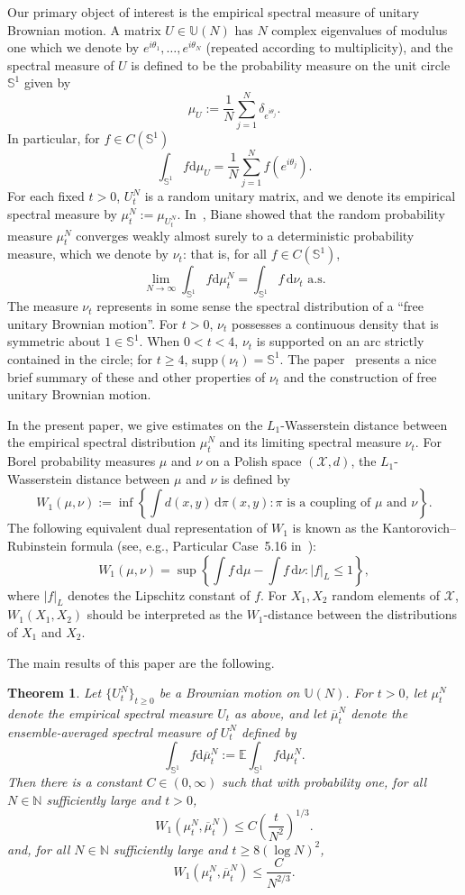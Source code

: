 \documentclass[11pt]{article}
\newtheorem{thm}[theo]{Theorem}
\theoremstyle{definition}
\numberwithin{equation}{section}
\numberwithin{figure}{section}
\numberwithin{table}{section}
\newcommand{\Circle}{\mathbb{S}^1}
\newcommand{\E}{\mathbb{E}}
\newcommand*{\dd}{\mathrm{d}}
\newcommand*{\dmu}{\dd \mu}
\newcommand*{\dbmu}{\dd \overline{\mu}}
\begin{document}
Our primary object of interest is the empirical spectral measure of unitary Brownian motion. A matrix $U\in\mathbb{U}(N)$ has $N$ complex eigenvalues of modulus one which we denote by $e^{i\theta_1},\ldots,e^{i\theta_N}$ (repeated according to multiplicity), and the spectral measure of $U$ is defined to be the probability measure on the unit circle $\mathbb{S}^1$ given by
\[
\mu_U:=\frac{1}{N}\sum_{j=1}^N \delta_{e^{i\theta_j}}.
\]
In particular, for $f\in C(\mathbb{S}^1)$
\[
\int_{\mathbb{S}^1} f \dmu_U = \frac{1}{N}\sum_{j=1}^N f(e^{i\theta_j}).
\]
For each fixed $t>0$, $U^N_t$ is a random unitary matrix, and we denote its empirical spectral measure by $\mu^N_t:=\mu_{U^N_t}$. In~\cite{Biane1997}, Biane showed that the random probability measure $\mu^N_t$ converges weakly almost surely to a deterministic probability measure, which we denote by $\nu_t$: that is, for all $f\in C(\mathbb{S}^1)$,
\[
\lim_{N\rightarrow\infty} \int_{\mathbb{S}^1} f \dmu^N_t = \int_{\mathbb{S}^1} f\,\dd\nu_t \text{ a.s.}
\]
The measure $\nu_t$ represents in some sense the spectral distribution of a ``free unitary Brownian motion''. For $t>0$, $\nu_t$ possesses a continuous density that is symmetric about $1\in\mathbb{S}^1$. When $0<t<4$, $\nu_t$ is supported on an arc strictly contained in the circle; for $t\ge4$, $\mathrm{supp}(\nu_t)=\mathbb{S}^1$. The paper~\cite{CDK2016} presents a nice brief summary of these and other properties of $\nu_t$ and the construction of free unitary Brownian motion.

In the present paper, we give estimates on the $L_1$-Wasserstein distance between the empirical spectral distribution $\mu_t^N$ and its limiting spectral measure $\nu_t$. For Borel probability measures $\mu$ and $\nu$ on a Polish space $(\mathcal{X},d)$, the $L_1$-Wasserstein distance between $\mu$ and $\nu$ is defined by
\[
W_1(\mu,\nu):=\inf \left\{\int d(x,y)\,\dd\pi(x,y): \pi \text{ is a coupling of } \mu \text{ and } \nu\right\}.
\]
The following equivalent dual representation of $W_1$ is known as the Kantorovich--Rubinstein formula (see, e.g., Particular Case~5.16 in~\cite{Vil}):
\[
W_1(\mu,\nu) = \sup \left\{\int f\,\dmu -\int f\,\dd\nu : |f|_{L}\le1 \right\},
\]
where $|f|_L$ denotes the Lipschitz constant of $f$. For $X_1,X_2$ random elements of $\mathcal{X}$, $W_1(X_1,X_2)$ should be interpreted as the $W_1$-distance between the distributions of $X_1$ and $X_2$.


The main results of this paper are the following.
\begin{thm}\label{T:main}
Let $\{U^N_t\}_{t\ge0}$ be a Brownian motion on $\mathbb{U}(N)$. For $t>0$, let $\mu_t^N$ denote the empirical spectral measure $U_t$ as above, and let $\overline{\mu}_t^N$ denote the ensemble-averaged spectral measure of $U^N_t$ defined by
\[
\int_{\Circle}f\dbmu^N_t:=\E\int_{\Circle}f\dmu^N_t.
\]
Then there is a constant $C\in(0,\infty)$ such that with probability one, for all $N\in\mathbb{N}$ sufficiently large and $t>0$,
\[
W_1(\mu^N_{t},\overline{\mu}^N_{t})\le C\left(\frac{t}{N^2}\right)^{1/3}.
\]
and, for all $N\in\mathbb{N}$ sufficiently large and $t\ge 8(\log N)^2$,
\[
W_1(\mu^N_{t},\overline{\mu}^N_{t})\le \frac{C}{N^{2/3}}.
\]
\end{thm}
\end{document}
